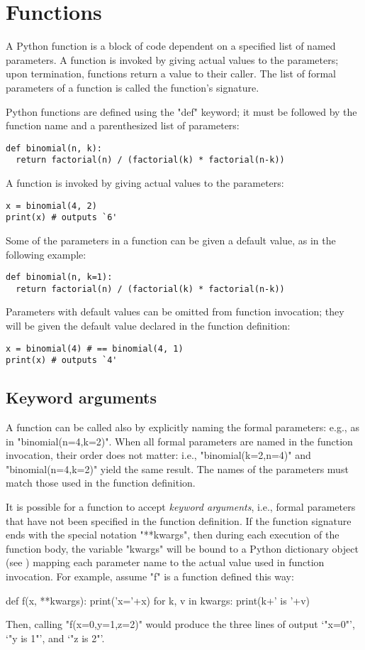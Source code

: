 {\section{Functions}
\label{sec:functions}

A Python function is a block of code dependent on a specified list of
named parameters.  A function is invoked by giving actual values to
the parameters; upon termination, functions return a value to their
caller.  The list of formal parameters of a function is called the
function's signature.

Python functions are defined using the "def" keyword; it must be
followed by the function name and a parenthesized list of parameters:
\begin{lstlisting}
def binomial(n, k):
  return factorial(n) / (factorial(k) * factorial(n-k))
\end{lstlisting}
A function is invoked by giving actual values to the parameters:
\begin{lstlisting}
x = binomial(4, 2)
print(x) # outputs `6'
\end{lstlisting}

Some of the parameters in a function can be given a default value, as
in the following example:
\begin{lstlisting}
def binomial(n, k=1):
  return factorial(n) / (factorial(k) * factorial(n-k))
\end{lstlisting}
Parameters with default values can be omitted from function
invocation; they will be given the default value declared in the
function definition:
\begin{lstlisting}
x = binomial(4) # == binomial(4, 1)
print(x) # outputs `4'
\end{lstlisting}

\subsection{Keyword arguments}
\label{sec:kwargs}

A function can be called also by explicitly naming the formal
parameters: e.g., as in "binomial(n=4,k=2)".  When all formal
parameters are named in the function invocation, their order does not
matter: i.e., "binomial(k=2,n=4)" and "binomial(n=4,k=2)" yield the
same result.  The names of the parameters must match those used in the
function definition.

It is possible for a function to accept \emph{keyword arguments},
i.e., formal parameters that have not been specified in the function
definition.  If the function signature ends with the special notation
"**kwargs", then during each execution of the function body, the
variable "kwargs" will be bound to a Python dictionary object (see
) mapping each parameter name to the actual value
used in function invocation.  For example, assume "f" is a function
defined this way:
\begin{codexmp}
  def f(x, **kwargs):
    print('x='+x)
    for k, v in kwargs:
      print(k+' is '+v)
\end{codexmp}
Then, calling "f(x=0,y=1,z=2)" would produce the three lines of
output `"x=0"', `"y is 1"', and `"z is 2"'.

}
